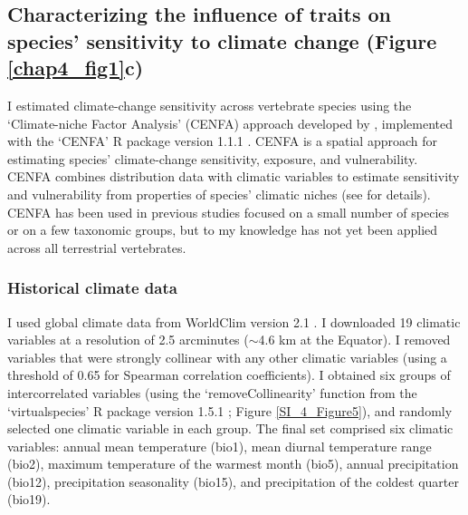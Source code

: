 \pagebreak

\subsection{Characterizing the influence of traits on species' sensitivity to climate change (Figure \ref{chap4_fig1}c)}

I estimated climate-change sensitivity across vertebrate species using the `Climate-niche Factor Analysis' (CENFA) approach developed by \citet{Rinnan2019}, implemented with the `CENFA'  R package  version 1.1.1 \citep{CENFA}. CENFA is a spatial approach for estimating species' climate-change sensitivity, exposure, and vulnerability. CENFA combines distribution data with climatic variables to estimate sensitivity and vulnerability from properties of species' climatic niches (see \citet{Rinnan2019} for details). CENFA has been used in previous studies focused on a small number of species or on a few taxonomic groups, but to my knowledge has not yet been applied across all terrestrial vertebrates.

\subsubsection{Historical climate data}
I used global climate data  from WorldClim version 2.1 \citep{Fick2017}. I downloaded 19 climatic variables at a resolution of 2.5 arcminutes ($\sim$4.6 km at the Equator). I removed variables that were strongly collinear with any other climatic variables (using a threshold of 0.65 for Spearman correlation coefficients). I obtained six groups of intercorrelated variables (using the `removeCollinearity' function from the `virtualspecies' R package version 1.5.1 \citep{virtualspecies}; Figure \ref{SI_4_Figure5}), and randomly selected one climatic variable in each group. The final set comprised six climatic variables: annual mean temperature (bio1), mean diurnal temperature range (bio2), maximum temperature of the warmest month (bio5), annual precipitation (bio12), precipitation seasonality (bio15), and precipitation of the coldest quarter (bio19).

